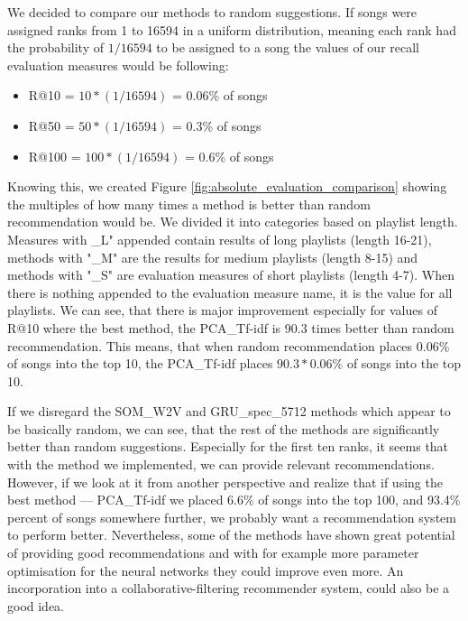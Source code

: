 We decided to compare our methods to random suggestions. If songs were assigned ranks from 1 to 16594 in a uniform distribution, meaning each rank had the probability of $1/16594$ to be assigned to a song the values of our recall evaluation measures would be following:
\begin{itemize}
    \item R@10 =  $ 10*(1/16594) $ = 0.06\% of songs
    \item R@50 = $ 50*(1/16594) $ = 0.3\% of songs
    \item R@100 = $ 100*(1/16594) $ = 0.6\% of songs
\end{itemize}

Knowing this, we created Figure \ref{fig:absolute_evaluation_comparison} showing the multiples of how many times a method is better than random recommendation would be. We divided it into categories based on playlist length. Measures with \_L" appended contain results of long playlists (length 16-21), methods with "\_M" are the results for medium playlists (length 8-15) and methods with "\_S" are evaluation measures of short playlists (length 4-7). When there is nothing appended to the evaluation measure name, it is the value for all playlists. We can see, that there is major improvement especially for values of R@10 where the best method, the PCA\_Tf-idf is 90.3 times better than random recommendation. This means, that when random recommendation places 0.06\% of songs into the top 10, the PCA\_Tf-idf places $90.3*0.06\%$ of songs into the top 10. 

If we disregard the SOM\_W2V and GRU\_spec\_5712 methods which appear to be basically random, we can see, that the rest of the methods are significantly better than random suggestions. Especially for the first ten ranks, it seems that with the method we implemented, we can provide relevant recommendations. \\

However, if we look at it from another perspective and realize that if using the best method --- PCA\_Tf-idf we placed 6.6\% of songs into the top 100, and 93.4\% percent of songs somewhere further, we probably want a recommendation system to perform better. Nevertheless, some of the methods have shown great potential of providing good recommendations and with for example more parameter optimisation for the neural networks they could improve even more. An incorporation into a collaborative-filtering recommender system, could also be a good idea.

